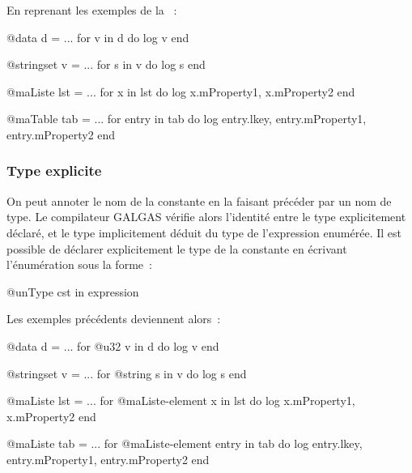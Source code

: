 En reprenant les exemples de la ~:

\begin{galgas4}
@data d = ...
for v in d do
  log v
end
\end{galgas4}



\begin{galgas4}
@stringset v = ...
for s in v do
  log s
end
\end{galgas4}


\begin{galgas4}
@maListe lst = ...
for x in lst do
  log x.mProperty1, x.mProperty2
end
\end{galgas4}


\begin{galgas4}
@maTable tab = ...
for entry in tab do
  log entry.lkey, entry.mProperty1, entry.mProperty2
end
\end{galgas4}

\subsubsection{Type explicite}

On peut annoter le nom de la constante en la faisant précéder par un nom de type. Le compilateur GALGAS vérifie alors l'identité entre le type explicitement déclaré, et le type implicitement déduit du type de l'expression enumérée. Il est possible de déclarer explicitement le type de la constante en écrivant l'énumération sous la forme~:

\begin{galgas4}
@unType cst in expression
\end{galgas4}

Les exemples précédents deviennent alors~:

\begin{galgas4}
@data d = ...
for @u32 v in d do
  log v
end
\end{galgas4}



\begin{galgas4}
@stringset v = ...
for @string s in v do
  log s
end
\end{galgas4}


\begin{galgas4}
@maListe lst = ...
for @maListe-element x in lst do
  log x.mProperty1, x.mProperty2
end
\end{galgas4}


\begin{galgas4}
@maListe tab = ...
for @maListe-element entry in tab do
  log entry.lkey, entry.mProperty1, entry.mProperty2
end
\end{galgas4}



